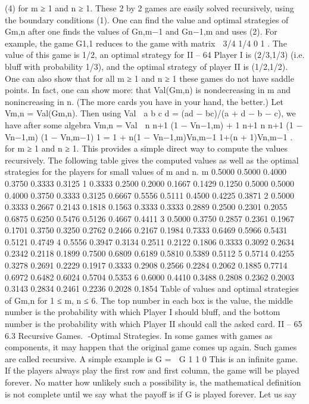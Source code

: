 (4)
for m ≥ 1 and n ≥ 1. These 2 by 2 games are easily solved recursively, using the boundary
conditions (1). One can find the value and optimal strategies of Gm,n after one finds the
values of Gn,m−1 and Gn−1,m and uses (2). For example, the game G1,1 reduces to the
game with matrix  3/4 1/4
0 1
. The value of this game is 1/2, an optimal strategy for
II – 64
Player I is (2/3,1/3) (i.e. bluff with probability 1/3), and the optimal strategy of player
II is (1/2,1/2).
One can also show that for all m ≥ 1 and n ≥ 1 these games do not have saddle points.
In fact, one can show more: that Val(Gm,n) is nondecreasing in m and nonincreasing in n.
(The more cards you have in your hand, the better.) Let Vm,n = Val(Gm,n). Then using
Val  a b
c d
= (ad − bc)/(a + d − b − c), we have after some algebra
Vm,n = Val  n
n+1 (1 − Vn−1,m) + 1
n+1
n
n+1 (1 − Vn−1,m)
(1 − Vn,m−1) 1
= 1 + n(1 − Vn−1,m)Vn,m−1
1+(n + 1)Vn,m−1
.
for m ≥ 1 and n ≥ 1. This provides a simple direct way to compute the values recursively.
The following table gives the computed values as well as the optimal strategies for the
players for small values of m and n.
m
0.5000 0.5000 0.4000 0.3750 0.3333 0.3125
1 0.3333 0.2500 0.2000 0.1667 0.1429 0.1250
0.5000 0.5000 0.4000 0.3750 0.3333 0.3125
0.6667 0.5556 0.5111 0.4500 0.4225 0.3871
2 0.5000 0.3333 0.2667 0.2143 0.1818 0.1563
0.3333 0.3333 0.2889 0.2500 0.2301 0.2055
0.6875 0.6250 0.5476 0.5126 0.4667 0.4411
3 0.5000 0.3750 0.2857 0.2361 0.1967 0.1701
0.3750 0.3250 0.2762 0.2466 0.2167 0.1984
0.7333 0.6469 0.5966 0.5431 0.5121 0.4749
4 0.5556 0.3947 0.3134 0.2511 0.2122 0.1806
0.3333 0.3092 0.2634 0.2342 0.2118 0.1899
0.7500 0.6809 0.6189 0.5810 0.5389 0.5112
5 0.5714 0.4255 0.3278 0.2691 0.2229 0.1917
0.3333 0.2908 0.2566 0.2284 0.2062 0.1885
0.7714 0.6972 0.6482 0.6024 0.5704 0.5353
6 0.6000 0.4410 0.3488 0.2808 0.2362 0.2003
0.3143 0.2834 0.2461 0.2236 0.2028 0.1854
Table of values and optimal strategies of Gm,n for 1 ≤ m, n ≤ 6. The top number in each
box is the value, the middle number is the probability with which Player I should bluff,
and the bottom number is the probability with which Player II should call the asked card.
II – 65
6.3 Recursive Games. -Optimal Strategies. In some games with games as
components, it may happen that the original game comes up again. Such games are called
recursive. A simple example is
G =
 G 1
1 0
This is an infinite game. If the players always play the first row and first column, the game
will be played forever. No matter how unlikely such a possibility is, the mathematical
definition is not complete until we say what the payoff is if G is played forever. Let us say
